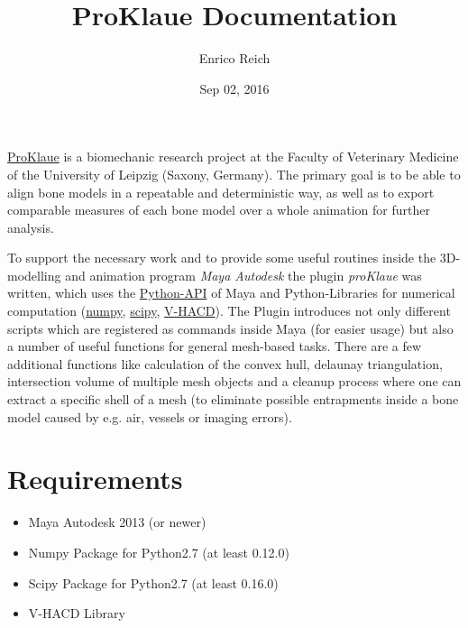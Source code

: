\documentclass[letterpaper,10pt,english]{sphinxmanual}
\title{ProKlaue Documentation}
\date{Sep 02, 2016}
\author{Enrico Reich}
\begin{document}
\maketitle
\tableofcontents
{}\label{index::doc}

\label{index:module-proKlaue}
\href{http://www.zv.uni-leipzig.de/service/kommunikation/medienredaktion/nachrichten.html?ifab\_modus=detail\&ifab\_id=6004}{ProKlaue} is a biomechanic research project at the Faculty of Veterinary Medicine of the University of Leipzig (Saxony, Germany). The primary goal is to be able to align bone models in a repeatable and deterministic way, as well as to export comparable measures of each bone model over a whole animation for further analysis.

To support the necessary work and to provide some useful routines inside the 3D-modelling and animation program \emph{Maya Autodesk} the plugin \emph{proKlaue} was written, which uses the \href{http://download.autodesk.com/us/maya/2011help/CommandsPython/}{Python-API} of Maya and Python-Libraries for numerical computation (\href{http://www.numpy.org/}{numpy}, \href{https://www.scipy.org/}{scipy}, \href{https://github.com/kmammou/v-hacd}{V-HACD}). The Plugin introduces not only different scripts which are registered as commands inside Maya (for easier usage) but also a number of useful functions for general mesh-based tasks. There are a few additional functions like calculation of the convex hull, delaunay triangulation, intersection volume of multiple mesh objects and a cleanup process where one can extract a specific shell of a mesh (to eliminate possible entrapments inside a bone model caused by e.g. air, vessels or imaging errors).


\chapter{Requirements}
\label{index:welcome-to-proklaue-s-documentation}\label{index:main}\label{index:requirements}\label{index:module-proKlaue}\begin{itemize}
\item {} 
Maya Autodesk 2013 (or newer)

\item {} 
Numpy Package for Python2.7 (at least 0.12.0)

\item {} 
Scipy Package for Python2.7 (at least 0.16.0)

\item {} 
V-HACD Library

\end{itemize}
\end{document}

